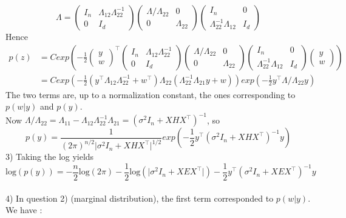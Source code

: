 \documentclass[11pt,a4paper]{article}
\begin{document}
$$\Lambda = 
\begin{pmatrix}I_n &\Lambda_{12}\Lambda_{22}^{-1} \\ 0  &I_d\end{pmatrix}
\begin{pmatrix} \Lambda / \Lambda_{22} & 0 \\ 0 &  \Lambda_{22} \end{pmatrix}
\begin{pmatrix}I_n &0\\ \Lambda_{22}^{-1} \Lambda_{12}  &I_d\end{pmatrix}
$$
Hence $$\begin{aligned}p(z) &= C exp (-\frac{1}{2} \begin{pmatrix} y \\ w \end{pmatrix}^{\top} 
\begin{pmatrix}I_n &\Lambda_{12}\Lambda_{22}^{-1} \\ 0  &I_d\end{pmatrix}
\begin{pmatrix} \Lambda / \Lambda_{22} & 0 \\ 0 &  \Lambda_{22} \end{pmatrix}
\begin{pmatrix}I_n &0\\ \Lambda_{22}^{-1} \Lambda_{12}  &I_d\end{pmatrix}
\begin{pmatrix} y \\ w \end{pmatrix})
%
\\&= C exp \left( - \frac{1}{2} ( y^{\top} \Lambda_{12} \Lambda_{22}^{-1} + w^{\top})\Lambda_{22}(\Lambda_{22}^{-1}\Lambda_{21}y + w ) \right) exp(-\frac{1}{2} y^{\top} \Lambda/\Lambda_{22} y)
\end{aligned}
$$
The two terms are, up to a normalization constant, the ones corresponding to $p(w\vert y)$ and $p(y)$.
%
\\Now $ \Lambda/\Lambda_{22} = \Lambda_{11} - \Lambda_{12}\Lambda_{22}^{-1} \Lambda_{21} = (\sigma^2 I_n + X H X^{\top})^{-1}$, so 
$$p(y) = \frac{1}{(2 \pi)^{n/2}\vert  \sigma^2 I_n + X H X^{\top} \vert ^{1/2}} exp (-\frac{1}{2} y^{\top}  (\sigma^2 I_n + X H X^{\top})^{-1} y)$$
%
\vspace{5mm}3) Taking the log yields 
$$\mathrm{log}(p(y)) = -\frac{n}{2} \mathrm{log} (2 \pi) - \frac{1}{2} \mathrm{log} ( \vert \sigma^2 I_n +X E X^{\top} \vert ) - \frac{1}{2} y^{\top} (\sigma^2  I_n +X E X^{\top} )^{-1} y $$
%
\\[5mm]4) In question 2) (marginal distribution), the first term corresponded to $p(w\vert y)$. We have :
\end{document}
